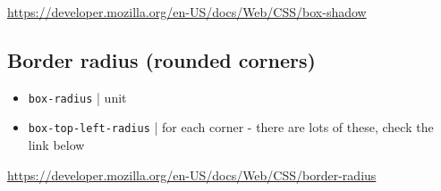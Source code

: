 \href{Box shadow on MDN}{https://developer.mozilla.org/en-US/docs/Web/CSS/box-shadow}

\subsection{Border radius (rounded corners)}

\begin{itemize}
    \item \texttt{box-radius} | unit
    \item \texttt{box-top-left-radius} | for each corner - there are lots of these, check the link below
\end{itemize}

\href{Box shadow on MDN}{https://developer.mozilla.org/en-US/docs/Web/CSS/border-radius}


